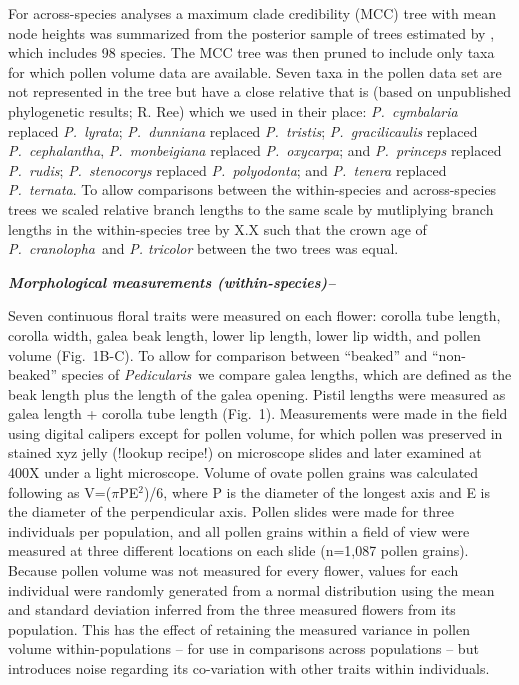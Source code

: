 \documentclass[12pt,letterpaper]{article}
\def\PC{\emph{P.~cranolopha}}
\def\P{\emph{Pedicularis}}
\renewcommand{\subsection}[1]{%
\bigskip
{\noindent \normalfont \bf \emph{#1}}
}
\begin{document}
For across-species analyses a maximum clade credibility (MCC) tree with mean node heights was summarized from the posterior sample of trees estimated by \citep{eaton_floral_2012}, which includes 98 species. The MCC tree was then pruned to include only taxa for which pollen volume data are available. Seven taxa in the pollen data set are not represented in the tree but have a close relative that is (based on unpublished phylogenetic results; R. Ree) which we used in their place: \emph{P.~cymbalaria} replaced \emph{P.~lyrata}; \emph{P.~dunniana} replaced \emph{P.~tristis}; \emph{P.~gracilicaulis} replaced \emph{P.~cephalantha}, \emph{P.~monbeigiana} replaced \emph{P.~oxycarpa}; and \emph{P.~princeps} replaced \emph{P.~rudis}; \emph{P.~stenocorys} replaced \emph{P.~polyodonta}; and \emph{P.~tenera} replaced \emph{P.~ternata}. To allow comparisons between the within-species and across-species trees we scaled relative branch lengths to the same scale by mutliplying branch lengths in the within-species tree by X.X such that the crown age of \PC~and \emph{P. tricolor} between the two trees was equal. 

\subsection{Morphological measurements (within-species)--}
Seven continuous floral traits were measured on each flower: corolla tube length, corolla width, galea beak length, lower lip length, lower lip width, and pollen volume (Fig.~1B-C). To allow for comparison between ``beaked'' and  ``non-beaked'' species of \P~we compare galea lengths, which are defined as the beak length plus the length of the galea opening. Pistil lengths were measured as galea length + corolla tube length (Fig.~1). Measurements were made in the field using digital calipers except for pollen volume, for which pollen was preserved in stained xyz jelly (!lookup recipe!) on microscope slides and later examined at 400X under a light microscope. Volume of ovate pollen grains was calculated following \cite{aguilar} as V=($\pi$PE$^2$)/6, where P is the diameter of the longest axis and E is the diameter of the perpendicular axis. Pollen slides were made for three individuals per population, and all pollen grains within a field of view were measured at three different locations on each slide (n=1,087 pollen grains). Because pollen volume was not measured for every flower, values for each individual were randomly generated from a normal distribution using the mean and standard deviation inferred from the three measured flowers from its population. This has the effect of retaining the measured variance in pollen volume within-populations -- for use in comparisons across populations -- but introduces noise regarding its co-variation with other traits within individuals. 
\end{document}
